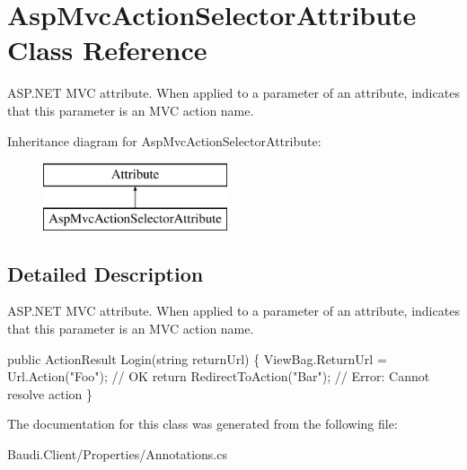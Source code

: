 \hypertarget{class_asp_mvc_action_selector_attribute}{}\section{Asp\+Mvc\+Action\+Selector\+Attribute Class Reference}
\label{class_asp_mvc_action_selector_attribute}


A\+S\+P.\+N\+E\+T M\+V\+C attribute. When applied to a parameter of an attribute, indicates that this parameter is an M\+V\+C action name.  


Inheritance diagram for Asp\+Mvc\+Action\+Selector\+Attribute\+:\begin{figure}[H]
\begin{center}
\leavevmode
\includegraphics[height=2.000000cm]{class_asp_mvc_action_selector_attribute}
\end{center}
\end{figure}


\subsection{Detailed Description}
A\+S\+P.\+N\+E\+T M\+V\+C attribute. When applied to a parameter of an attribute, indicates that this parameter is an M\+V\+C action name. 


\begin{DoxyCode}
\textcolor{keyword}{public} ActionResult Login(\textcolor{keywordtype}{string} returnUrl) \{
  ViewBag.ReturnUrl = Url.Action(\textcolor{stringliteral}{"Foo"}); \textcolor{comment}{// OK}
  \textcolor{keywordflow}{return} RedirectToAction(\textcolor{stringliteral}{"Bar"}); \textcolor{comment}{// Error: Cannot resolve action}
\}
\end{DoxyCode}


The documentation for this class was generated from the following file\+:\begin{DoxyCompactItemize}
\item 
Baudi.\+Client/\+Properties/Annotations.\+cs\end{DoxyCompactItemize}
